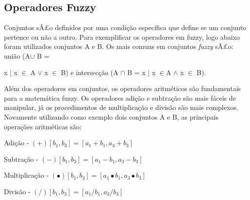 \documentclass[12pt]{article}
\begin{document}
\subsection{Operadores Fuzzy}
Conjuntos sÃ£o definidos por uma condição específica que define se um conjunto pertence ou não a outro. Para exemplificar os operadores em fuzzy, logo abaixo foram utilizados conjuntos A e B.
Os mais comuns em conjuntos \textit{fuzzy} sÃ£o: união 
(A\begin{math} \cup \end{math} B ={ x | x \begin{math}\in \end{math} A \begin{math}\vee \end{math} x \begin{math}\in \end{math} B) e intersecção (A \begin{math} \cap \end{math} B = 
x | x \begin{math}\in \end{math}A \begin{math}\wedge \end{math} x \begin{math}\in \end{math} B).  

Além dos operadores em conjuntos, os operadores aritméticos são fundamentais para a matemática fuzzy. Os operadores adição e subtração são mais fáceis de manipular, já os procedimentos de multiplicação e divisão são mais complexos. Novamente utilizando como exemplo dois conjuntos A e B, as principais operações aritméticas são:

Adição - 
\begin{math} [{a_1},{a_3}] (+) [{b_1},{b_3}]= [{a_1 + b_1,a_3 + b_3}]  \end{math}

Subtração - \begin{math} [{a_1},{a_3}] (-) [{b_1},{b_3}] = [{a_1 - b_1,a_3 - b_3}]  \end{math}

Multiplicação - 
\begin{math} [{a_1},{a_3}] (\bullet) [{b_1},{b_3}]= [{a_1 \bullet b_1,a_3 \bullet b_3}]  \end{math}

Divisão - 
\begin{math} [{a_1},{a_3}] (/) [{b_1},{b_3}]= [{a_1 / b_1,a_3 / b_3}]  \end{math} 



}
\end{document}
